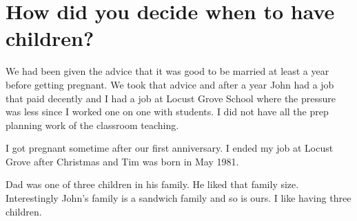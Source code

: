 \section{How did you decide when to have children?}
We had been given the advice that it was good to be married at least a year before getting pregnant.
We took that advice and after a year John had a job that paid decently and I had a job at Locust Grove School where the pressure was less since I worked one on one with students.
I did not have all the prep planning work of the classroom teaching.

I got pregnant sometime after our first anniversary.
I ended my job at Locust Grove after Christmas and Tim was born in May 1981.

Dad was one of three children in his family.
He liked that family size.
Interestingly John's family is a sandwich family and so is ours.
I like having three children.





